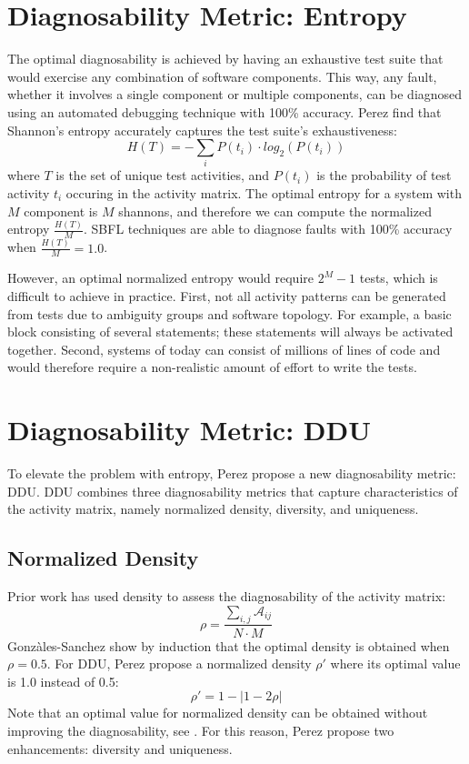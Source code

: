 \documentclass[twoside,a4paper,11pt]{memoir}
\begin{document}
\section{Diagnosability Metric: Entropy}
The optimal diagnosability is achieved by having an exhaustive test suite that would exercise any combination of software components.
This way, any fault, whether it involves a single component or multiple components, can be diagnosed using an automated debugging technique with 100\% accuracy.
Perez \etal \cite{DBLP:conf/icse/PerezAD17} find that Shannon's entropy accurately captures the test suite's exhaustiveness:
\begin{equation}
  H(T) = - \sum_i P(t_i) \cdot log_2(P(t_i))
\end{equation}
where $T$ is the set of unique test activities, and $P(t_i)$ is the probability of test activity $t_i$ occuring in the activity matrix.
The optimal entropy for a system with $M$ component is $M$ shannons, and therefore we can compute the normalized entropy $\frac{H(T)}{M}$.
SBFL techniques are able to diagnose faults with 100\% accuracy when $\frac{H(T)}{M} = 1.0$.

However, an optimal normalized entropy would require $2^M -1$ tests, which is difficult to achieve in practice.
First, not all activity patterns can be generated from tests due to ambiguity groups and software topology.
For example, a basic block consisting of several statements; these statements will always be activated together.
Second, systems of today can consist of millions of lines of code and would therefore require a non-realistic amount of effort to write the tests.

\section{Diagnosability Metric: DDU}
To elevate the problem with entropy, Perez \etal \cite{DBLP:conf/icse/PerezAD17} propose a new diagnosability metric: DDU.
DDU combines three diagnosability metrics that capture characteristics of the activity matrix, namely normalized density, diversity, and uniqueness.

\subsection{Normalized Density}
Prior work \cite{5954476} has used density to assess the diagnosability of the activity matrix:
\begin{equation}
  \rho = \frac{\sum_{i,j}\mathcal{A}_{ij}}{N \cdot M}
\end{equation}
Gonz\`ales-Sanchez \etal \cite{5954476} show by induction that the optimal density is obtained when $\rho = 0.5$.
For DDU, Perez \etal \cite{DBLP:conf/icse/PerezAD17} propose a normalized density $\rho'$ where its optimal value is 1.0 instead of 0.5:
\begin{equation}
  \rho' = 1 - | 1 - 2 \rho |
\end{equation}
Note that an optimal value for normalized density can be obtained without improving the diagnosability, see .
For this reason, Perez \etal \cite{DBLP:conf/icse/PerezAD17} propose two enhancements: diversity and uniqueness.
\end{document}
